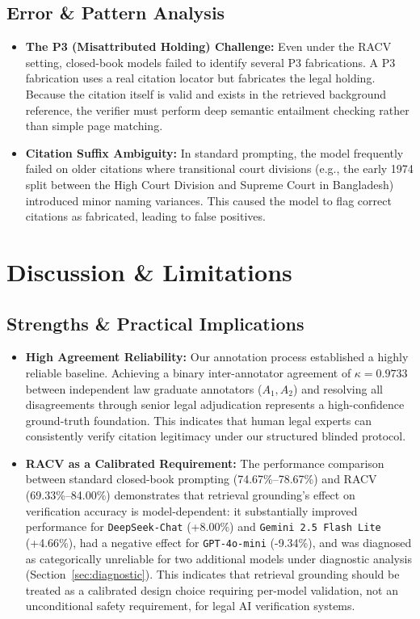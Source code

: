 \documentclass[conference]{IEEEtran}
\begin{document}
\subsection{Error \& Pattern Analysis}
\begin{itemize}
\item \textbf{The P3 (Misattributed Holding) Challenge:} Even under the RACV setting, closed-book models failed to identify several P3 fabrications. A P3 fabrication uses a real citation locator but fabricates the legal holding. Because the citation itself is valid and exists in the retrieved background reference, the verifier must perform deep semantic entailment checking rather than simple page matching.
\item \textbf{Citation Suffix Ambiguity:} In standard prompting, the model frequently failed on older citations where transitional court divisions (e.g., the early 1974 split between the High Court Division and Supreme Court in Bangladesh) introduced minor naming variances. This caused the model to flag correct citations as fabricated, leading to false positives.
\end{itemize}

\section{Discussion \& Limitations}

\subsection{Strengths \& Practical Implications}
\begin{itemize}
\item \textbf{High Agreement Reliability:} Our annotation process established a highly reliable baseline. Achieving a binary inter-annotator agreement of $\kappa = 0.9733$ between independent law graduate annotators ($A_1, A_2$) and resolving all disagreements through senior legal adjudication represents a high-confidence ground-truth foundation. This indicates that human legal experts can consistently verify citation legitimacy under our structured blinded protocol.
\item \textbf{RACV as a Calibrated Requirement:} The performance comparison between standard closed-book prompting (74.67\%--78.67\%) and RACV (69.33\%--84.00\%) demonstrates that retrieval grounding's effect on verification accuracy is model-dependent: it substantially improved performance for \texttt{DeepSeek-Chat} (+8.00\%) and \texttt{Gemini 2.5 Flash Lite} (+4.66\%), had a negative effect for \texttt{GPT-4o-mini} (-9.34\%), and was diagnosed as categorically unreliable for two additional models under diagnostic analysis (Section~\ref{sec:diagnostic}). This indicates that retrieval grounding should be treated as a calibrated design choice requiring per-model validation, not an unconditional safety requirement, for legal AI verification systems.
\end{itemize}
\end{document}
